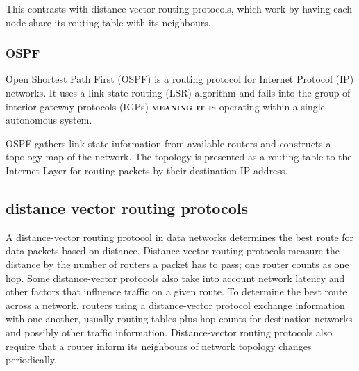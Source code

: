 \documentclass[a4paper,12pt]{book}
\begin{document}
This contrasts with distance-vector routing protocols, which work by having each node share its routing table with its neighbours. %

\subsubsection{OSPF}
Open Shortest Path First (OSPF) is a routing protocol for Internet Protocol (IP) networks. It uses a link state routing (LSR) algorithm and falls into the group of interior gateway protocols (IGPs) \textsc{\textbf{meaning it is}} operating within a single autonomous system.

OSPF gathers link state information from available routers and constructs a topology map of the network. The topology is presented as a routing table to the Internet Layer for routing packets by their destination IP address. 

%


\subsection{distance vector routing protocols}
A distance-vector routing protocol in data networks determines the best route for data packets based on distance. Distance-vector routing protocols measure the distance by the number of routers a packet has to pass; one router counts as one hop. Some distance-vector protocols also take into account network latency and other factors that influence traffic on a given route. To determine the best route across a network, routers using a distance-vector protocol exchange information with one another, usually routing tables plus hop counts for destination networks and possibly other traffic information. Distance-vector routing protocols also require that a router inform its neighbours of network topology changes periodically.
\end{document}
